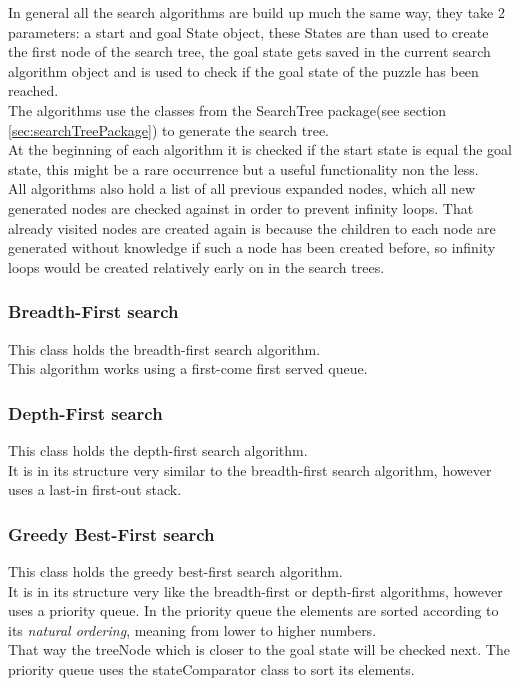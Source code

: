\documentclass[journal]{IEEEtran}
\begin{document}
In general all the search algorithms are build up much the same way, they take 2 parameters: a start and goal State object, these States are than used to create the first node of the search tree, the goal state gets saved in the current search algorithm object and is used to check if the goal state of the puzzle has been reached. \\
The algorithms use the classes from the SearchTree package(see section \ref{sec:searchTreePackage}) to generate the search tree. \\ 
At the beginning of each algorithm it is checked if the start state is equal the goal state, this might be a rare occurrence but a useful functionality non the less. \\
All algorithms also hold a list of all previous expanded nodes, which all new generated nodes are checked against in order to prevent infinity loops. That already visited nodes are created again is because the children to each node are generated without knowledge if such a node has been created before, so infinity loops would be created relatively early on in the search trees. \\

\subsubsection{Breadth-First search}
This class holds the breadth-first search algorithm. \\
This algorithm works using a first-come first served queue. \\

\subsubsection{Depth-First search}
This class holds the depth-first search algorithm. \\
It is in its structure very similar to the breadth-first search algorithm, however uses a last-in first-out stack. \\

\subsubsection{Greedy Best-First search}
This class holds the greedy best-first search algorithm.\\
It is in its structure very like the breadth-first or depth-first algorithms, however uses a priority queue. In the priority queue the elements are sorted according to its \textit{natural ordering}, meaning from lower to higher numbers. \\
That way the treeNode which is closer to the goal state will be checked next. 
The priority queue uses the stateComparator class to sort its elements.\\
\end{document}
